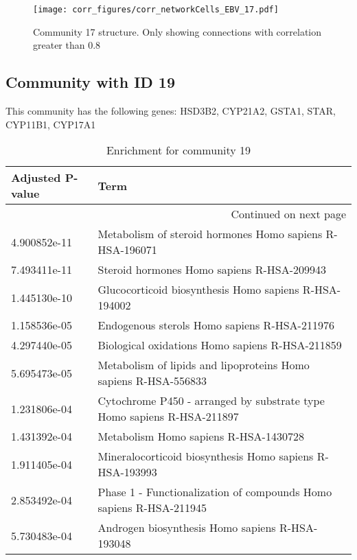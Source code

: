 \begin{figure}[h!]
\centering
\texttt{[image: corr\_figures/corr\_networkCells\_EBV\_17.pdf]}
\caption{Community 17 structure. Only showing connections with correlation greater than 0.8}
\end{figure}




\subsection*{Community with ID 19}
This community has the following genes: HSD3B2, CYP21A2, GSTA1, STAR, CYP11B1, CYP17A1
\\
\begin{longtable}{p{2.4cm}p{14.5cm}}
\caption{Enrichment for community 19}\\
\toprule
Adjusted \newline P-value &                                                                    Term \\
\midrule
\endhead
\midrule
\multicolumn{2}{r}{{Continued on next page}} \\
\midrule
\endfoot

\bottomrule
\endlastfoot
             4.900852e-11 &                Metabolism of steroid hormones Homo sapiens R-HSA-196071 \\
             7.493411e-11 &                              Steroid hormones Homo sapiens R-HSA-209943 \\
             1.445130e-10 &                   Glucocorticoid biosynthesis Homo sapiens R-HSA-194002 \\
             1.158536e-05 &                            Endogenous sterols Homo sapiens R-HSA-211976 \\
             4.297440e-05 &                         Biological oxidations Homo sapiens R-HSA-211859 \\
             5.695473e-05 &         Metabolism of lipids and lipoproteins Homo sapiens R-HSA-556833 \\
             1.231806e-04 &  Cytochrome P450 - arranged by substrate type Homo sapiens R-HSA-211897 \\
             1.431392e-04 &                                   Metabolism Homo sapiens R-HSA-1430728 \\
             1.911405e-04 &                Mineralocorticoid biosynthesis Homo sapiens R-HSA-193993 \\
             2.853492e-04 &      Phase 1 - Functionalization of compounds Homo sapiens R-HSA-211945 \\
             5.730483e-04 &                         Androgen biosynthesis Homo sapiens R-HSA-193048 \\
\end{longtable}


